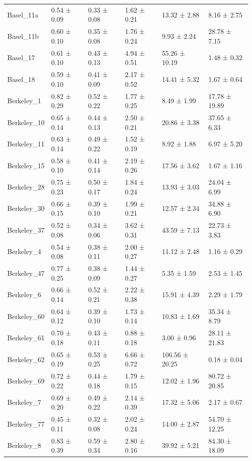 \begin{tabular}{llllll}
Basel_11a & 0.54 ± 0.09 & 0.33 ± 0.08 & 1.62 ± 0.21 & 13.32 ± 2.88 & 8.16 ± 2.75 \\
Basel_11b & 0.60 ± 0.10 & 0.35 ± 0.08 & 1.76 ± 0.24 & 9.93 ± 2.24 & 28.78 ± 7.15 \\
Basel_17 & 0.61 ± 0.10 & 0.43 ± 0.13 & 4.94 ± 0.51 & 55.26 ± 10.19 & 1.48 ± 0.32 \\
Basel_18 & 0.59 ± 0.10 & 0.41 ± 0.09 & 2.17 ± 0.52 & 14.41 ± 5.32 & 1.67 ± 0.64 \\
Berkeley_1 & 0.82 ± 0.29 & 0.52 ± 0.22 & 1.77 ± 0.25 & 8.49 ± 1.99 & 17.78 ± 19.89 \\
Berkeley_10 & 0.65 ± 0.14 & 0.44 ± 0.13 & 2.50 ± 0.21 & 20.86 ± 3.38 & 37.65 ± 6.33 \\
Berkeley_11 & 0.63 ± 0.14 & 0.49 ± 0.22 & 1.52 ± 0.19 & 8.92 ± 1.88 & 6.97 ± 5.20 \\
Berkeley_15 & 0.58 ± 0.10 & 0.41 ± 0.14 & 2.19 ± 0.26 & 17.56 ± 3.62 & 1.67 ± 1.16 \\
Berkeley_28 & 0.75 ± 0.23 & 0.50 ± 0.17 & 1.84 ± 0.24 & 13.93 ± 3.03 & 24.04 ± 6.99 \\
Berkeley_30 & 0.66 ± 0.15 & 0.39 ± 0.10 & 1.99 ± 0.21 & 12.57 ± 2.34 & 34.88 ± 6.90 \\
Berkeley_37 & 0.52 ± 0.08 & 0.34 ± 0.06 & 3.62 ± 0.31 & 43.59 ± 7.13 & 22.73 ± 3.83 \\
Berkeley_4 & 0.54 ± 0.08 & 0.38 ± 0.11 & 2.00 ± 0.27 & 11.12 ± 2.48 & 1.16 ± 0.29 \\
Berkeley_47 & 0.77 ± 0.25 & 0.38 ± 0.09 & 1.44 ± 0.27 & 5.35 ± 1.59 & 2.53 ± 1.45 \\
Berkeley_6 & 0.66 ± 0.14 & 0.52 ± 0.21 & 2.22 ± 0.38 & 15.91 ± 4.39 & 2.29 ± 1.79 \\
Berkeley_60 & 0.64 ± 0.12 & 0.39 ± 0.10 & 1.73 ± 0.14 & 10.83 ± 1.69 & 35.34 ± 8.79 \\
Berkeley_61 & 0.70 ± 0.18 & 0.43 ± 0.11 & 0.88 ± 0.18 & 3.00 ± 0.96 & 28.11 ± 21.83 \\
Berkeley_62 & 0.65 ± 0.19 & 0.53 ± 0.25 & 6.66 ± 0.72 & 106.56 ± 20.25 & 0.18 ± 0.04 \\
Berkeley_69 & 0.72 ± 0.22 & 0.44 ± 0.18 & 1.79 ± 0.15 & 12.02 ± 1.96 & 80.72 ± 20.85 \\
Berkeley_7 & 0.69 ± 0.20 & 0.49 ± 0.22 & 2.14 ± 0.39 & 17.32 ± 5.06 & 2.17 ± 0.67 \\
Berkeley_77 & 0.45 ± 0.11 & 0.32 ± 0.08 & 2.02 ± 0.24 & 14.00 ± 2.87 & 54.70 ± 12.25 \\
Berkeley_8 & 0.83 ± 0.39 & 0.59 ± 0.34 & 2.80 ± 0.16 & 39.92 ± 5.21 & 84.30 ± 18.09 \\

\end{tabular}
